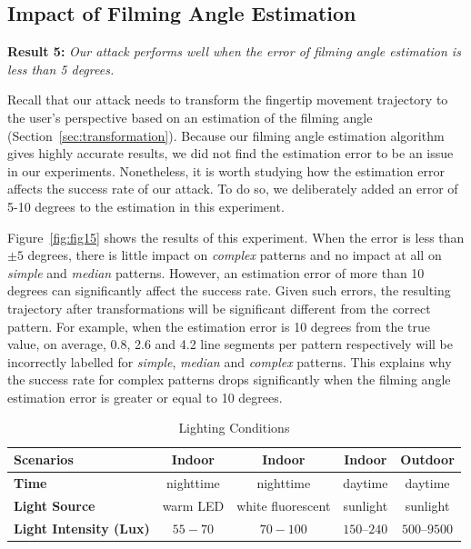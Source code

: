     \subsection{Impact of Filming Angle Estimation \label{sec:angle}}

    \noindent \textbf{Result 5:} \emph{Our attack performs well when the error of filming angle estimation is less than 5 degrees.}

   Recall that our attack needs to transform the fingertip movement trajectory to the
   user's perspective based on an estimation of the filming angle
   (Section~\ref{sec:transformation}).
   Because our filming angle estimation
    algorithm gives highly accurate results, we did not find the estimation error to be an issue in our experiments.
   Nonetheless, it is worth studying how the estimation error affects the success rate of our attack. To do so, we deliberately added an error of 5-10 degrees to the estimation in this experiment.

    Figure~\ref{fig:fig15} shows the results of this experiment. When the error is less than $\pm 5$ degrees, there is little impact
    on \emph{complex} patterns and no impact at all on \emph{simple} and
    \emph{median} patterns. However, an estimation error of more than 10 degrees can significantly affect the success rate.
    Given such errors, the resulting trajectory after transformations will
    be significant different from the correct pattern.
    For example, when the estimation error is 10 degrees from the
    true value,  on average, 0.8, 2.6 and 4.2 line segments per pattern respectively will
    be incorrectly labelled for \emph{simple}, \emph{median} and
    \emph{complex} patterns. This explains why the success rate for complex patterns drops significantly when the filming angle estimation error is greater or equal to 10 degrees.


       \begin{table}[!t]
            \centering
            \caption{Lighting Conditions}
            \label{tab:light}
            \scriptsize
            \begin{tabular}{lcccc}
                \toprule
                \textbf{Scenarios} & Indoor  & Indoor & Indoor  & Outdoor\\
                \midrule
                \textbf{Time} & nighttime &  nighttime & daytime & daytime \\
                \textbf{Light Source}& warm LED & white fluorescent & sunlight &  sunlight \\
                \textbf{Light Intensity (Lux)} & $55-70$ & $70-100$ & $150$--$240$ & $500$--$9500$ \\
                \bottomrule
            \end{tabular}
        \end{table}

